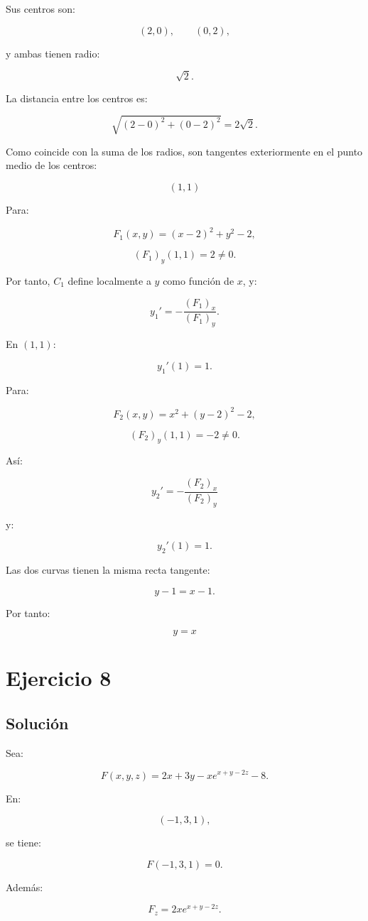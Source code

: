\documentclass[11pt,a4paper]{article}
\begin{document}
Sus centros son:

\[
(2,0),
\qquad
(0,2),
\]

y ambas tienen radio:

\[
\sqrt2.
\]

La distancia entre los centros es:

\[
\sqrt{(2-0)^2+(0-2)^2}
=
2\sqrt2.
\]

Como coincide con la suma de los radios, son tangentes exteriormente en el punto medio de los centros:

\[
\boxed{
(1,1)
}
\]

Para:

\[
F_1(x,y)
=
(x-2)^2+y^2-2,
\]

\[
(F_1)_y(1,1)=2\neq0.
\]

Por tanto, \(C_1\) define localmente a \(y\) como función de \(x\), y:

\[
y_1'
=
-\frac{(F_1)_x}{(F_1)_y}.
\]

En \((1,1)\):

\[
y_1'(1)=1.
\]

Para:

\[
F_2(x,y)
=
x^2+(y-2)^2-2,
\]

\[
(F_2)_y(1,1)=-2\neq0.
\]

Así:

\[
y_2'
=
-\frac{(F_2)_x}{(F_2)_y}
\]

y:

\[
y_2'(1)=1.
\]

Las dos curvas tienen la misma recta tangente:

\[
y-1=x-1.
\]

Por tanto:

\[
\boxed{
y=x
}
\]

\section{Ejercicio 8}
\subsection{Solución}

Sea:

\[
F(x,y,z)
=
2x+3y-xe^{x+y-2z}-8.
\]

En:

\[
(-1,3,1),
\]

se tiene:

\[
F(-1,3,1)=0.
\]

Además:

\[
F_z
=
2xe^{x+y-2z}.
\]
\end{document}
